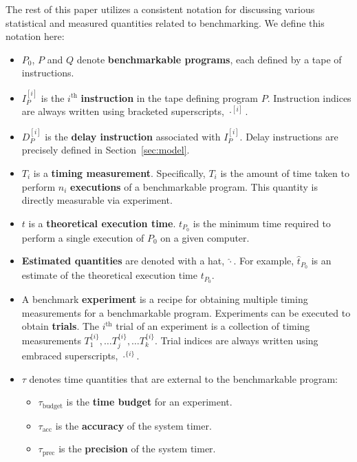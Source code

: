 \documentclass[conference]{IEEEtran}
\begin{document}
The rest of this paper utilizes a consistent notation for discussing various statistical and
measured quantities related to benchmarking. We define this notation here:

\begin{itemize}
    \item
    $P_0$, $P$ and $Q$ denote \textbf{benchmarkable programs}, each defined by a tape of
    instructions.

    \item
    $I^{[i]}_{P}$ is the $i^{\textrm{th}}$ \textbf{instruction} in the tape defining program $P$.
    Instruction indices are always written using bracketed superscripts, $\cdot^{[i]}$.

    \item
    $D^{[i]}_{P}$ is the \textbf{delay instruction} associated with $I^{[i]}_{P}$. Delay
    instructions are precisely defined in Section~\ref{sec:model}.

    \item
    $T_i$ is a \textbf{timing measurement}. Specifically, $T_i$ is the amount of time taken
    to perform $n_i$ \textbf{executions} of a benchmarkable program. This quantity is
    directly measurable via experiment.

    \item
    $t$ is a \textbf{theoretical execution time}. $t_{P_0}$ is the minimum time required to
    perform a single execution of $P_0$ on a given computer.

    \item
    \textbf{Estimated quantities} are denoted with a hat, $\hat\cdot$. For example,
    $\hat{t}_{P_0}$ is an estimate of the theoretical execution time $t_{P_0}$.

    \item
    A benchmark \textbf{experiment} is a recipe for obtaining multiple timing measurements
    for a benchmarkable program. Experiments can be executed to obtain \textbf{trials}. The
    $i^{\textrm{th}}$ trial of an experiment is a collection of timing measurements
    $T^{\{i\}}_1, \dots T^{\{i\}}_j, \dots T^{\{i\}}_k$. Trial indices are always
    written using embraced superscripts, $\cdot^{\{i\}}$.

    \item
    $\tau$ denotes time quantities that are external to the benchmarkable program:
    \begin{itemize}
        \item $\tau_{\textrm{budget}}$ is the \textbf{time budget} for an experiment.
        \item $\tau_{\textrm{acc}}$ is the \textbf{accuracy} of the system timer.
        \item $\tau_{\textrm{prec}}$ is the \textbf{precision} of the system timer.
    \end{itemize}


\end{itemize}
\end{document}
